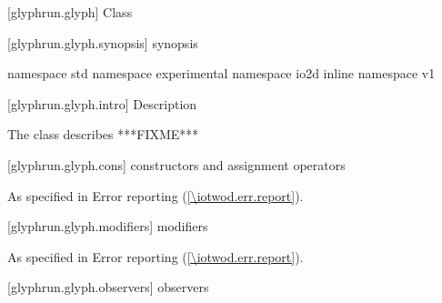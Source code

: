 
 [glyphrun.glyph] {Class }

 [glyphrun.glyph.synopsis] { synopsis}

\begin{codeblock}
namespace std { namespace experimental { namespace io2d { inline namespace v1 {
} } } }
\end{codeblock}

 [glyphrun.glyph.intro] { Description}

\pnum
{}
The  class describes ***FIXME***

 [glyphrun.glyph.cons] { constructors and assignment operators}

\begin{itemdecl}
\end{itemdecl}
\begin{itemdescr}
\pnum
\effects

\pnum
\throws
As specified in Error reporting (\ref{\iotwod.err.report}).

\pnum
\remarks

\pnum
\errors

\pnum
\realnotes

\end{itemdescr}

 [glyphrun.glyph.modifiers] { modifiers}

\begin{itemdecl}
\end{itemdecl}
\begin{itemdescr}
\pnum
\effects

\pnum
\throws
As specified in Error reporting (\ref{\iotwod.err.report}).

\pnum
\remarks

\pnum
\errors

\pnum
\realnotes

\end{itemdescr}

 [glyphrun.glyph.observers] { observers}

\begin{itemdecl}
\end{itemdecl}
\begin{itemdescr}
\pnum
\returns

\end{itemdescr}
